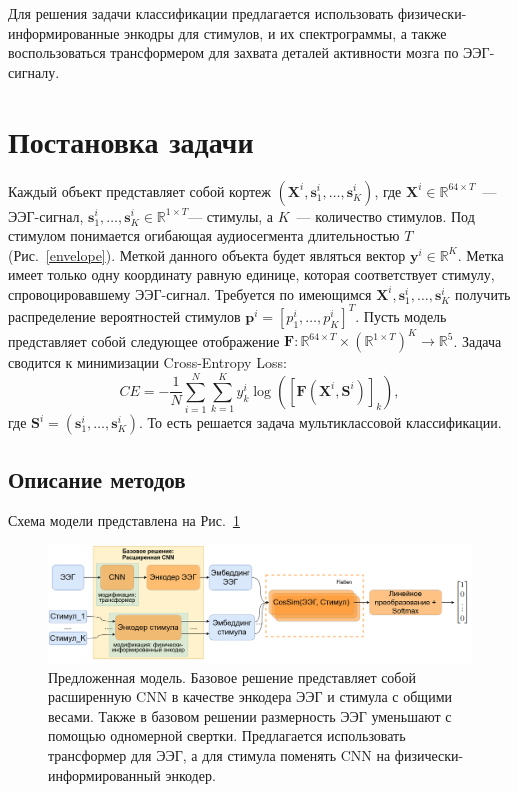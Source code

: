 \documentclass{article}
\begin{document}
    Для решения задачи классификации предлагается использовать физически-информированные энкодры для стимулов, и их спектрограммы, а также воспользоваться трансформером для захвата деталей активности мозга по ЭЭГ-сигналу.

\section{Постановка задачи}    
    Каждый объект представляет собой кортеж $(\mathbf{X}^i, \mathbf{s}_1^i, \dots, \mathbf{s}_K^i)$, где $\mathbf{X}^i \in \mathbb{R}^{64 \times T}$~--- ЭЭГ-сигнал, $\mathbf{s}_1^i, \dots, \mathbf{s}_K^i \in \mathbb{R}^{1 \times T}$--- стимулы, а $K$~--- количество стимулов. Под стимулом понимается огибающая аудиосегмента длительностью $T$(Рис.~\ref{envelope}). Меткой данного объекта будет являться вектор $\mathbf{y}^i \in \mathbb{R}^K$. Метка имеет только одну координату равную единице, которая соответствует стимулу, спровоцировавшему ЭЭГ-сигнал. Требуется по имеющимся $\mathbf{X}^i, \mathbf{s}_1^i, \dots, \mathbf{s}_K^i$ получить распределение вероятностей стимулов $\mathbf{p}^i = [p_1^i, \dots , p_K^i]^T$. Пусть модель представляет собой следующее отображение $\mathbf{F} : \mathbb{R}^{64 \times T} \times \left( \mathbb{R}^{1\times T} \right)^K \rightarrow \mathbb{R}^5$. Задача сводится к минимизации Cross-Entropy Loss:
    $$CE = - \frac{1}{N}\sum_{i=1}^N\sum_{k=1}^K y_k^i \log \left( \left[ \mathbf{F}(\mathbf{X}^i, \mathbf{S}^i) \right]_k \right),$$
    где $\mathbf{S}^i = (\mathbf{s}^i_1, \dots, \mathbf{s}^i_K)$. То есть решается задача мультиклассовой классификации.

\subsection{Описание методов}
    Схема модели представлена на Рис.~\ref{model}
    \begin{figure}[h]
        \centering
        \includegraphics[scale=0.35]{model_architecture.png}
        \caption{Предложенная модель. Базовое решение представляет собой расширенную CNN в качестве энкодера ЭЭГ и стимула с общими весами. Также в базовом решении размерность ЭЭГ уменьшают с помощью одномерной свертки. Предлагается использовать трансформер для ЭЭГ, а для стимула поменять CNN на физически-информированный энкодер.}
        \label{model}
    \end{figure}
\end{document}
